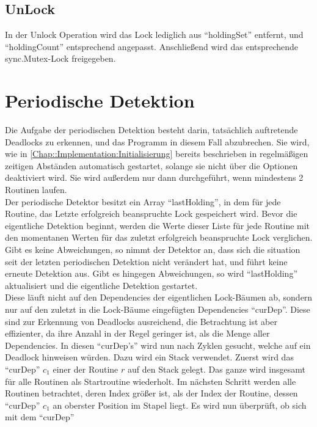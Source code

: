 \subsection{UnLock}\label{Chap::Implementation:Logging.UnLock}
In der Unlock Operation wird das Lock lediglich aus ``holdingSet'' entfernt,
und ``holdingCount'' entsprechend angepasst. Anschließend wird das entsprechende
sync.Mutex-Lock freigegeben.

\section{Periodische Detektion} \label{Chap::Implementation:Periodic}
Die Aufgabe der periodischen Detektion besteht darin, tatsächlich auftretende
Deadlocks zu erkennen, und das Programm in diesem Fall abzubrechen. Sie wird,
wie in \ref{Chap::Implementation:Initialisierung} bereits beschrieben in 
regelmäßigen zeitigen Abständen automatisch gestartet, solange sie nicht 
über die Optionen deaktiviert wird. Sie wird außerdem nur dann durchgeführt,
wenn mindestens 2 Routinen laufen.\\
Der periodische Detektor besitzt ein Array ``lastHolding'', in dem für jede 
Routine, das Letzte erfolgreich beanspruchte Lock gespeichert wird. Bevor 
die eigentliche Detektion beginnt, werden die Werte dieser Liste für jede 
Routine mit den momentanen Werten für das zuletzt erfolgreich beanspruchte 
Lock verglichen. Gibt es keine Abweichungen, so nimmt der Detektor an, dass sich 
die situation seit der letzten periodischen Detektion nicht verändert hat, und 
führt keine erneute Detektion aus. Gibt es hingegen Abweichungen, so wird 
``lastHolding'' aktualisiert und die eigentliche Detektion gestartet.\\
Diese läuft nicht auf den Dependencies der eigentlichen Lock-Bäumen ab, 
sondern nur auf den zuletzt in die 
Lock-Bäume eingefügten Dependencies ``curDep''. Diese sind zur Erkennung von
Deadlocks ausreichend, die Betrachtung ist aber effizienter, da ihre Anzahl in 
der Regel geringer ist, als die Menge aller Dependencies. In diesen ``curDep's''
wird nun nach Zyklen gesucht, welche auf ein Deadlock hinweisen würden.
Dazu wird ein Stack verwendet. Zuerst wird das ``curDep'' $c_1$ einer der 
Routine $r$
auf den Stack gelegt. Das ganze wird insgesamt für alle Routinen als 
Startroutine wiederholt. Im nächsten Schritt werden alle Routinen betrachtet,
deren Index größer ist, als der Index der Routine, dessen ``curDep'' $c_1$ an 
oberster
Position im Stapel liegt. Es wird nun überprüft, ob sich mit dem ``curDep''
